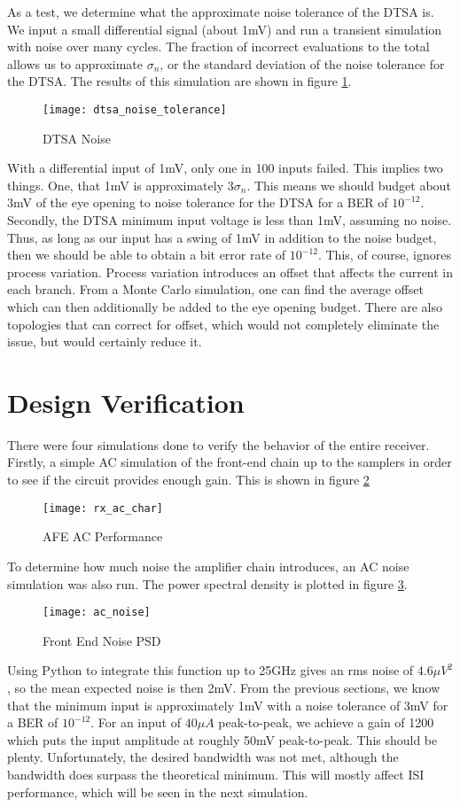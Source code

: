 As a test, we determine what the approximate noise tolerance of the DTSA is. We input a small differential signal (about 1mV) and run a transient simulation with noise over many cycles. The fraction of incorrect evaluations to the total allows us to approximate $\sigma_n$, or the standard deviation of the noise tolerance for the DTSA. The results of this simulation are shown in figure \ref{fig:dtsa_noise}.
\begin{figure}[h]
\centering
\texttt{[image: dtsa\_noise\_tolerance]}
\caption{DTSA Noise}
\label{fig:dtsa_noise}
\end{figure}
With a differential input of 1mV, only one in 100 inputs failed. This implies two things. One, that 1mV is approximately $3\sigma_n$. This means we should budget about 3mV of the eye opening to noise tolerance for the DTSA for a BER of $10^{-12}$. Secondly, the DTSA minimum input voltage is less than 1mV, assuming no noise. Thus, as long as our input has a swing of 1mV in addition to the noise budget, then we should be able to obtain a bit error rate of $10^{-12}$. This, of course, ignores process variation. Process variation introduces an offset that affects the current in each branch. From a Monte Carlo simulation, one can find the average offset which can then additionally be added to the eye opening budget. There are also topologies that can correct for offset, which would not completely eliminate the issue, but would certainly reduce it.
\clearpage
\section{Design Verification}
There were four simulations done to verify the behavior of the entire receiver. Firstly, a simple AC simulation of the front-end chain up to the samplers in order to see if the circuit provides enough gain. This is shown in figure \ref{fig:afe_ac}
\begin{figure}[h]
\centering
\texttt{[image: rx\_ac\_char]}
\caption{AFE AC Performance}
\label{fig:afe_ac}
\end{figure}
\clearpage
To determine how much noise the amplifier chain introduces, an AC noise simulation was also run. The power spectral density is plotted in figure \ref{fig:psd}.
\begin{figure}[h]
\centering
\texttt{[image: ac\_noise]}
\caption{Front End Noise PSD}
\label{fig:psd}
\end{figure}

Using Python to integrate this function up to 25GHz gives an rms noise of $4.6\mu V^2$, so the mean expected noise is then 2mV.
\clearpage
From the previous sections, we know that the minimum input is approximately 1mV with a noise tolerance of 3mV for a BER of $10^{-12}$. For an input of $40\mu A$ peak-to-peak, we achieve a gain of 1200 which puts the input amplitude at roughly 50mV peak-to-peak. This should be plenty. Unfortunately, the desired bandwidth was not met, although the bandwidth does surpass the theoretical minimum. This will mostly affect ISI performance, which will be seen in the next simulation.

